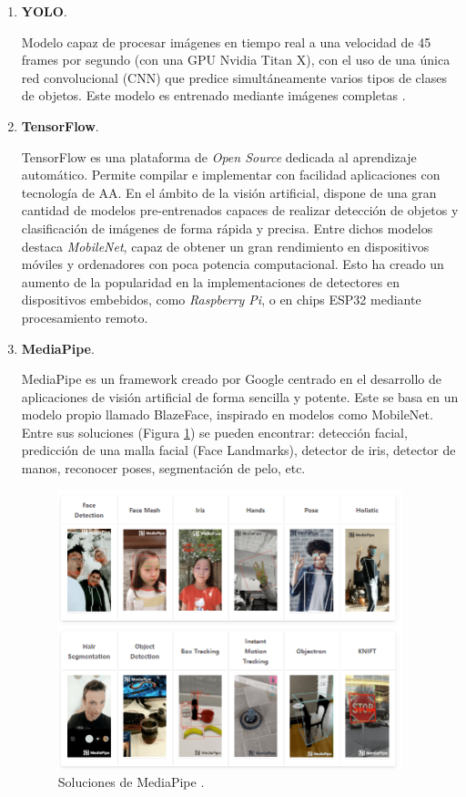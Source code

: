 \begin{enumerate}
	\item \textbf{YOLO}.
	
	Modelo capaz de procesar imágenes en tiempo real a una velocidad de 45 frames por segundo (con una GPU Nvidia Titan X), con el uso de una única red convolucional (CNN) que predice simultáneamente varios tipos de clases de objetos. Este modelo es entrenado mediante imágenes completas \cite{YOLO}.
	
	\item \textbf{TensorFlow}.
	
	TensorFlow es una plataforma de \textit{Open Source} dedicada al aprendizaje automático. Permite compilar e implementar con facilidad aplicaciones con tecnología de AA. En el ámbito de la visión artificial, dispone de una gran cantidad de modelos pre-entrenados capaces de realizar detección de objetos y clasificación de imágenes de forma rápida y precisa. Entre dichos modelos destaca \textit{MobileNet}, capaz de obtener un gran rendimiento en dispositivos móviles y ordenadores con poca potencia computacional. Esto ha creado un aumento de la popularidad en la implementaciones de detectores en dispositivos embebidos, como \textit{Raspberry Pi}, o en chips ESP32 mediante procesamiento remoto.
	
	\item \textbf{MediaPipe}.
	
	MediaPipe \cite{mediapipe} es un framework creado por Google centrado en el desarrollo de aplicaciones de visión artificial de forma sencilla y potente. Este se basa en un modelo propio llamado BlazeFace, inspirado en modelos como MobileNet. Entre sus soluciones (Figura \ref{fig:solMed}) se pueden encontrar: detección facial, predicción de una malla facial (Face Landmarks), detector de iris, detector de manos, reconocer poses, segmentación de pelo, etc.
	
	\begin{figure}[htp]
		\centering
		\includegraphics[width=10cm]{imagenes/solucionesMediaPipe.png}
		\caption{Soluciones de MediaPipe \cite{mdSolutions}.}
		\label{fig:solMed}
	\end{figure}
	

\end{enumerate}
